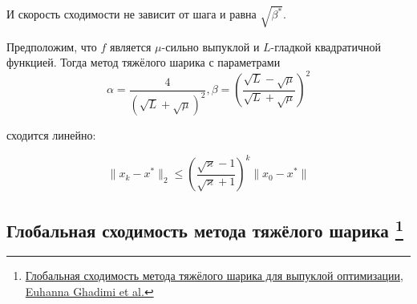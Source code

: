 \documentclass[
  russian,
  letterpaper,
  DIV=11,
  numbers=noendperiod]{scrartcl}
\begin{document}
И скорость сходимости не зависит от шага и равна \(\sqrt{\beta^*}\).

\begin{tcolorbox}[enhanced jigsaw, colbacktitle=quarto-callout-color!10!white, opacitybacktitle=0.6, arc=.35mm, toptitle=1mm, rightrule=.15mm, opacityback=0, titlerule=0mm, breakable, title=\textcolor{quarto-callout-color}{\faInfo}\hspace{0.5em}{Theorem}, colframe=quarto-callout-color-frame, coltitle=black, bottomtitle=1mm, left=2mm, toprule=.15mm, bottomrule=.15mm, colback=white, leftrule=.75mm]

Предположим, что \(f\) является \(\mu\)-сильно выпуклой и \(L\)-гладкой
квадратичной функцией. Тогда метод тяжёлого шарика с параметрами \[
\alpha = \dfrac{4}{(\sqrt{L} + \sqrt{\mu})^2}, \beta = \left(\dfrac{\sqrt{L} - \sqrt{\mu}}{\sqrt{L} + \sqrt{\mu}}\right)^2
\]

сходится линейно:

\[
\|x_k - x^*\|_2 \leq \left( \dfrac{\sqrt{\varkappa} - 1}{\sqrt{\varkappa} + 1} \right)^k \|x_0 - x^*\|
\]

\end{tcolorbox}

\subsection[Глобальная сходимость метода тяжёлого шарика
]{\texorpdfstring{Глобальная сходимость метода тяжёлого шарика
\footnote{\href{https://arxiv.org/abs/1412.7457}{Глобальная сходимость
  метода тяжёлого шарика для выпуклой оптимизации, Euhanna Ghadimi et
  al.}}}{Глобальная сходимость метода тяжёлого шарика }}\label{ux433ux43bux43eux431ux430ux43bux44cux43dux430ux44f-ux441ux445ux43eux434ux438ux43cux43eux441ux442ux44c-ux43cux435ux442ux43eux434ux430-ux442ux44fux436ux451ux43bux43eux433ux43e-ux448ux430ux440ux438ux43aux430}
\end{document}
